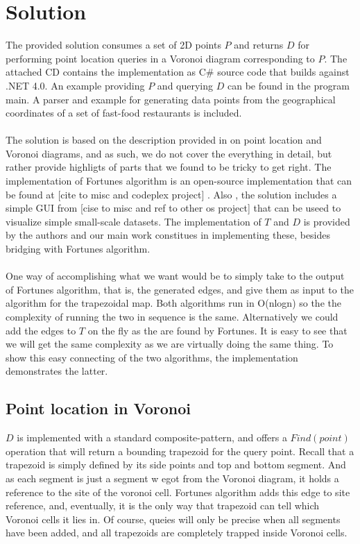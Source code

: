 \section{Solution}
The provided solution consumes a set of 2D points  $P$ and returns  $D$ for performing point location queries in a Voronoi diagram corresponding to $P$. The attached CD contains the implementation as C\# source code that builds against .NET 4.0. An example providing $P$ and querying $D$ can be found in the program main.  A parser and example for generating data points from  the geographical coordinates of a set of fast-food restaurants is included. 
\paragraph{}
The solution is based on the description provided in \cite{computational_geometry} on point location and Voronoi diagrams, and as such, we do not cover the everything in detail, but rather provide highligts of parts that we found to be tricky to get right.  The implementation of Fortunes algorithm is an open-source implementation that can be found at [cite to misc and codeplex project] . Also , the solution includes a simple GUI from [cise to misc and ref to other os project] that can be useed to visualize simple small-scale datasets.  The implementation of $T$ and $D$ is provided by the authors and our main work constitues in implementing these, besides bridging with Fortunes algorithm.
\paragraph{}
One way of accomplishing what we want would be to simply take to the output of Fortunes algorithm, that is, the generated edges, and give them as input to the algorithm for the trapezoidal map. Both algorithms run in O(nlogn)  so the the complexity of running the two in sequence is the same. Alternatively we could add the edges to $T$ on the fly as the are found by Fortunes. It is easy to see that we will get the same complexity as we are virtually doing the same thing. To show this easy connecting of the two algorithms, the implementation demonstrates the latter.

\subsection{Point location in Voronoi}
$D$ is implemented with a standard composite-pattern, and offers a $Find(point)$ operation that will return a bounding trapezoid for the query point.  Recall that a trapezoid is simply defined by its side points and top and bottom segment. And as each segment is just a segment w egot from the Voronoi diagram, it holds a reference to the site of the voronoi cell. Fortunes algorithm adds this edge to site reference, and, eventually, it is the only way that trapezoid can tell which Voronoi cells it lies in. Of course, queies will only be precise when all segments have been added, and all trapezoids are completely trapped inside Voronoi cells.
